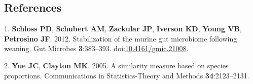 \documentclass[11pt,]{article}
\begin{document}
\newpage

\subsection*{References}\label{references}

\hypertarget{refs}{}
\hypertarget{ref-Schloss2012}{}
1. \textbf{Schloss PD}, \textbf{Schubert AM}, \textbf{Zackular JP},
\textbf{Iverson KD}, \textbf{Young VB}, \textbf{Petrosino JF}. 2012.
Stabilization of the murine gut microbiome following weaning. Gut
Microbes \textbf{3}:383--393.
doi:\href{https://doi.org/10.4161/gmic.21008}{10.4161/gmic.21008}.

\hypertarget{ref-Yue2005}{}
2. \textbf{Yue JC}, \textbf{Clayton MK}. 2005. A similarity measure
based on species proportions. Communications in Statistics-Theory and
Methods \textbf{34}:2123--2131.
\end{document}
